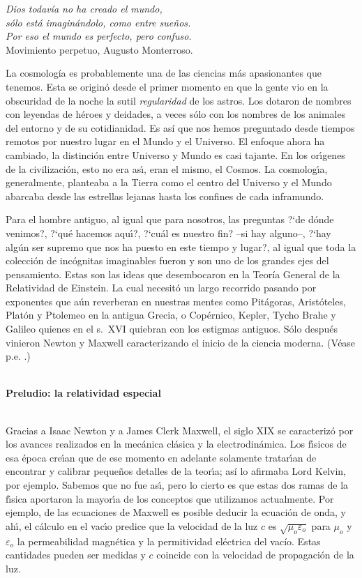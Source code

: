 \documentclass[12pt]{article}
\begin{document}
\begin{flushright}
{\it Dios todavía no ha creado el mundo,\\s\'olo est\'a imagin\'andolo, como entre sue\~nos.\\Por eso el mundo es perfecto, pero confuso.}\\{\footnotesize{\sc Movimiento perpetuo, Augusto Monterroso.}}
\end{flushright}

\noindent
La cosmología es probablemente una de las ciencias más apasionantes que tenemos. Esta se originó desde el primer momento en que la gente vio en la obscuridad de la noche la sutil \emph{regularidad} de los astros. Los dotaron de nombres con leyendas de héroes y deidades, a veces sólo con los nombres de los animales del entorno y de su cotidianidad. Es así que nos hemos preguntado desde tiempos remotos por nuestro lugar en el Mundo y el Universo. El enfoque ahora ha cambiado, la distinci\'on entre Universo y Mundo es casi tajante. En los or\'{\i}genes de la civilizaci\'on, esto no era as\'{\i}, eran el mismo, el Cosmos. La cosmolog\'{\i}a, generalmente, planteaba a la Tierra como el centro del Universo y el Mundo abarcaba desde las estrellas lejanas hasta los confines de cada inframundo.

Para el hombre antiguo, al igual que para nosotros, las preguntas ?`de d\'onde venimos?, ?`qu\'e hacemos aqu\'{\i}?, ?`cu\'al es nuestro fin? --si hay alguno--, ?`hay alg\'un ser supremo que nos ha puesto en este tiempo y lugar?, al igual que toda la colecci\'on de inc\'ognitas imaginables fueron y son uno de los grandes ejes del pensamiento. Estas son las ideas que desembocaron en la Teoría General de la Relatividad de Einstein. La cual necesitó un largo recorrido pasando por exponentes que aún reverberan en nuestras mentes como Pitágoras, Aristóteles, Platón y Ptolemeo en la antigua Grecia, o Copérnico, Kepler, Tycho Brahe y Galileo quienes en el s.~XVI quiebran con los estigmas antiguos. Sólo después vinieron Newton y Maxwell caracterizando el inicio de la ciencia moderna. (Véase p.e. \cite{EI,Koe}.)


\ \\
\textbf{\large Preludio: la relatividad especial}

\ \\
Gracias a Isaac Newton y a James Clerk Maxwell, el siglo XIX se caracteriz\'o por los avances realizados en la mec\'anica cl\'asica y la electrodin\'amica. Los f\'{\i}sicos de esa \'epoca cre\'{\i}an que de ese momento en adelante solamente tratar\'{\i}an de encontrar y calibrar peque\~nos detalles de la teor\'{\i}a; así lo afirmaba Lord Kelvin, por ejemplo. Sabemos que no fue as\'{\i}, pero lo cierto es que estas dos ramas de la f\'{\i}sica aportaron la mayor\'{\i}a de los conceptos que utilizamos actualmente. Por ejemplo, de las ecuaciones de Maxwell es posible deducir la ecuaci\'on de onda, y ah\'{\i}, el c\'alculo en el vac\'{\i}o predice que la velocidad de la luz $c$ es $\sqrt{\mu_o\varepsilon_o}$ para $\mu_o$ y $\varepsilon_o$ la permeabilidad magn\'etica y la permitividad el\'ectrica del vacío. Estas cantidades pueden ser medidas y $c$ coincide con la velocidad de propagación de la luz.
\end{document}
